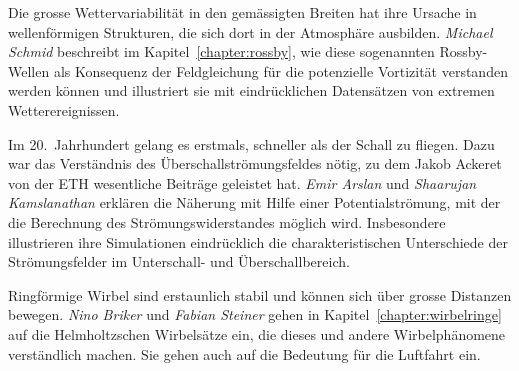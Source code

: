 Die grosse Wettervariabilität in den gemässigten Breiten hat ihre
%
Ursache in wellenförmigen Strukturen, die sich dort in der Atmosphäre
ausbilden.
\emph{Michael Schmid}
%
%
beschreibt im Kapitel~\ref{chapter:rossby}, wie diese sogenannten
Rossby-Wellen als Konsequenz der Feldgleichung für die potenzielle
Vortizität verstanden werden können und illustriert sie mit
%
eindrücklichen Datensätzen von extremen Wetterereignissen.

%
%

Im 20.~Jahrhundert gelang es erstmals, schneller als der Schall zu
fliegen.
Dazu war das Verständnis des Überschallströmungsfeldes nötig, zu dem
%
Jakob Ackeret von der ETH wesentliche Beiträge geleistet hat.
%
\emph{Emir Arslan}
%
%
und
\emph{Shaarujan Kamslanathan}
%
%
erklären die Näherung mit Hilfe einer Potentialströmung, mit der
die Berechnung des Strömungswiderstandes möglich wird.
Insbesondere illustrieren ihre Simulationen eindrücklich die
charakteristischen Unterschiede der Strömungsfelder im Unterschall-
und Überschallbereich.

Ringförmige Wirbel sind erstaunlich stabil und können sich über
%
grosse Distanzen bewegen.
\emph{Nino Briker}
%
%
und
\emph{Fabian Steiner}
%
%
gehen in Kapitel~\ref{chapter:wirbelringe} auf die Helmholtzschen
%
%
Wirbelsätze ein, die dieses und andere Wirbelphänomene verständlich
machen.
Sie gehen auch auf die Bedeutung für die Luftfahrt ein.
%



